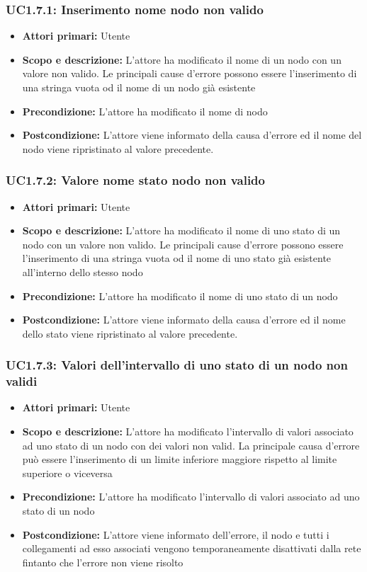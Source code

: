 \subsubsection{UC1.7.1: Inserimento nome nodo non valido} 
\begin{itemize} 
	\item{\textbf{Attori primari:} Utente} 
	\item{\textbf{Scopo e descrizione:} L'attore ha modificato il nome di un nodo con un valore non valido. Le principali cause d'errore possono essere l'inserimento di una stringa vuota od il nome di un nodo già esistente} 
	\item{\textbf{Precondizione:} L'attore ha modificato il nome di nodo} 
	\item{\textbf{Postcondizione:} L'attore viene informato della causa d'errore ed il nome del nodo viene ripristinato al valore precedente.} 
\end{itemize} 
\subsubsection{UC1.7.2: Valore nome stato nodo non valido} 
\begin{itemize} 
	\item{\textbf{Attori primari:} Utente} 
	\item{\textbf{Scopo e descrizione:} L'attore ha modificato il nome di uno stato di un nodo con un valore non valido. Le principali cause d'errore possono essere l'inserimento di una stringa vuota od il nome di uno stato già esistente all'interno dello stesso nodo} 
	\item{\textbf{Precondizione:} L'attore ha modificato il nome di uno stato di un nodo} 
	\item{\textbf{Postcondizione:} L'attore viene informato della causa d'errore ed il nome dello stato viene ripristinato al valore precedente.} 
\end{itemize} 
\subsubsection{UC1.7.3: Valori dell'intervallo di uno stato di un nodo non validi} 
\begin{itemize} 
	\item{\textbf{Attori primari:} Utente} 
	\item{\textbf{Scopo e descrizione:} L'attore ha modificato l'intervallo di valori associato ad uno stato di un nodo con dei valori non valid. La principale causa d'errore può essere l'inserimento di un limite inferiore maggiore rispetto al limite superiore o viceversa} 
	\item{\textbf{Precondizione:} L'attore ha modificato l'intervallo di valori associato ad uno stato di un nodo} 
	\item{\textbf{Postcondizione:} L'attore viene informato dell'errore, il nodo e tutti i collegamenti ad esso associati vengono temporaneamente disattivati dalla rete fintanto che l'errore non viene risolto} 
\end{itemize} 
